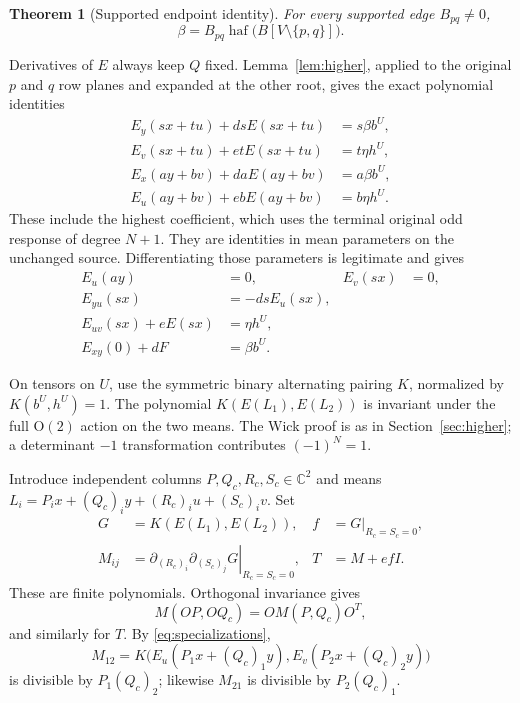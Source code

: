 \documentclass[11pt]{article}
\newtheorem{theorem}{Theorem}[section]
\numberwithin{equation}{section}
\begin{document}
\begin{theorem}[Supported endpoint identity]\label{thm:endpoint}
For every supported edge \(B_{pq}\ne0\),
\[
 \beta=B_{pq}\operatorname{haf}\bigl(B[V\setminus\{p,q\}]\bigr).
\]
\end{theorem}

Derivatives of \(E\) always keep \(Q\) fixed. Lemma~\ref{lem:higher}, applied
to the original \(p\) and \(q\) row planes and expanded at the other root,
gives the exact polynomial identities
\begin{equation}
 \begin{aligned}
 E_y(sx+tu)+dsE(sx+tu)&=s\beta b^U,\\
 E_v(sx+tu)+etE(sx+tu)&=t\eta h^U,\\
 E_x(ay+bv)+daE(ay+bv)&=a\beta b^U,\\
 E_u(ay+bv)+ebE(ay+bv)&=b\eta h^U.
 \end{aligned}
 \tag{7}\label{eq:boundary}
\end{equation}
These include the highest coefficient, which uses the terminal original odd
response of degree \(N+1\). They are identities in mean parameters on the
unchanged source. Differentiating those parameters is legitimate and gives
\begin{equation}
 \begin{aligned}
 E_u(ay)&=0,&E_v(sx)&=0,\\
 E_{yu}(sx)&=-dsE_u(sx),\\
 E_{uv}(sx)+eE(sx)&=\eta h^U,\\
 E_{xy}(0)+dF&=\beta b^U.
 \end{aligned}
 \tag{8}\label{eq:specializations}
\end{equation}

On tensors on \(U\), use the symmetric binary alternating pairing \(K\),
normalized by \(K(b^U,h^U)=1\). The polynomial
\(K(E(L_1),E(L_2))\) is invariant under the full \(\mathrm O(2)\) action
on the two means. The Wick proof is as in Section~\ref{sec:higher}; a
determinant \(-1\) transformation contributes \((-1)^N=1\).

Introduce independent columns \(P,Q_c,R_c,S_c\in\mathbb C^2\) and means
\(L_i=P_i x+(Q_c)_iy+(R_c)_iu+(S_c)_iv\). Set
\[
 \begin{aligned}
 G&=K(E(L_1),E(L_2)),& f&=G\big|_{R_c=S_c=0},\\
 M_{ij}&=\left.\partial_{(R_c)_i}\partial_{(S_c)_j}G\right|_{R_c=S_c=0},
 &T&=M+efI.
 \end{aligned}
\]
These are finite polynomials. Orthogonal invariance gives
\[
 M(OP,OQ_c)=O M(P,Q_c)O^T,
\]
and similarly for \(T\). By \eqref{eq:specializations},
\[
 M_{12}=K\bigl(E_u(P_1x+(Q_c)_1y),E_v(P_2x+(Q_c)_2y)\bigr)
\]
is divisible by \(P_1(Q_c)_2\); likewise \(M_{21}\) is divisible by
\(P_2(Q_c)_1\).
\end{document}
